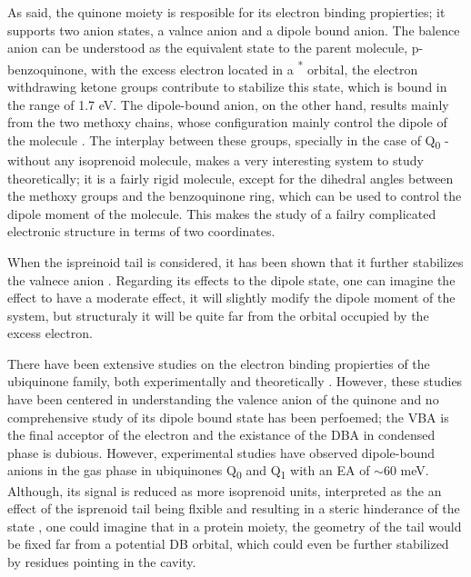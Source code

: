 As said, the quinone moiety is resposible for its electron binding propierties; it supports two anion states, a valnce anion and a dipole bound anion. The balence anion can be understood as the equivalent state to the parent molecule, p-benzoquinone, with the excess electron located in a \textpi \textsuperscript{*} orbital, the electron withdrawing ketone groups contribute to stabilize this state, which is bound in the range of 1.7 eV\cite{chen2024low}. The dipole-bound anion, on the other hand, results mainly from the two methoxy chains, whose configuration mainly control the dipole of the molecule \cite{ameixa2023parent}. The interplay between these groups, specially in the case of Q\textsubscript{0} - without any isoprenoid molecule, makes a very interesting system to study theoretically; it is a fairly rigid molecule, except for the dihedral angles between the methoxy groups and the benzoquinone ring, which can be used to control the dipole moment of the molecule. This makes the study of a failry  complicated electronic structure in terms of two coordinates.

When the ispreinoid tail is considered, it has been shown that it further stabilizes the valnece anion \cite{pshenichnyuk2020ionizing}. Regarding its effects to the dipole state, one can imagine the effect to have a moderate effect, it will slightly modify the dipole moment of the system, but structuraly it will be quite far from the orbital occupied by the excess electron.

There have been extensive studies on the electron binding propierties of the ubiquinone family, both experimentally \cite{ameixa2023parent,west2014anion,pshenichnyuk2020ionizing,bull2015anion} and theoretically \cite{ameixa2023parent,pshenichnyuk2020ionizing,haldar2020multilayer, nonella1998quantum, gamiz2017terminal}. However, these studies have been centered in understanding the valence anion of the quinone and no comprehensive study of its dipole bound state has been perfoemed; the VBA is the final acceptor of the electron and the existance of the DBA in condensed phase is dubious.
However, experimental studies have observed dipole-bound anions in the gas phase in ubiquinones Q\textsubscript{0} and Q\textsubscript{1}\cite{ameixa2023parent} with an EA of $\mathrm{\sim}$60 meV. Although, its signal is reduced as more isoprenoid units, interpreted as the an effect of the isprenoid tail being flxible and resulting in a steric hinderance of the state \cite{ameixa2023parent,pshenichnyuk2020ionizing}, one could imagine that in a protein moiety, the geometry of the tail would be fixed far from a potential DB orbital, which could even be further stabilized by residues pointing in the cavity.

